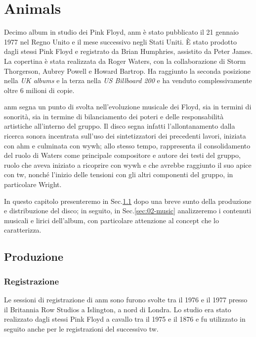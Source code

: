 \documentclass[class=book, crop=false, oneside, 12pt]{standalone}
\begin{document}
    \chapter{Animals}
    Decimo album in studio dei Pink Floyd, \acrlong{anm} è stato pubblicato il 21 gennaio 1977 nel Regno Unito e il mese successivo negli Stati Uniti. È stato prodotto dagli stessi Pink Floyd e registrato da Brian Humphries, assistito da Peter James. La copertina è stata realizzata da Roger Waters, con la collaborazione di Storm Thorgerson, Aubrey Powell e Howard Bartrop. Ha raggiunto la seconda posizione nella \emph{UK albums} e la terza nella \emph{US Billboard 200} e ha venduto complessivamente oltre 6 milioni di copie.

    \acrshort{anm} segna un punto di svolta nell'evoluzione musicale dei Floyd, sia in termini di sonorità, sia in termine di bilanciamento dei poteri e delle responsabilità artistiche all'interno del gruppo. Il disco segna infatti l'allontanamento dalla ricerca sonora incentrata sull'uso dei sintetizzatori dei precedenti lavori, iniziata con \acrlong{ahm} e culminata con \acrlong {wywh}; allo stesso tempo, rappresenta il consolidamento del ruolo di Waters come principale compositore e autore dei testi del gruppo, ruolo che aveva iniziato a ricoprire con \acrshort{wywh} e che avrebbe raggiunto il suo apice con \acrlong{tw}, nonché l'inizio delle tensioni con gli altri componenti del gruppo, in particolare Wright.

    In questo capitolo presenteremo in Sec.\ref{sec:02-production} dopo una breve sunto della produzione e distribuzione del disco; in seguito, in Sec.\ref{sec:02-music} analizzeremo i contenuti musicali e lirici dell'album, con particolare attenzione al concept che lo caratterizza.

    \section{Produzione}\label{sec:02-production}
    \subsection{Registrazione}
    Le sessioni di registrazione di \acrshort{anm} sono furono svolte tra il 1976 e il 1977 presso il Britannia Row Studios a Islington, a nord di Londra. Lo studio era stato realizzato dagli stessi Pink Floyd a cavallo tra il 1975 e il 1876 e fu utilizzato in seguito anche per le registrazioni del successivo \acrlong{tw}. 
\end{document}
